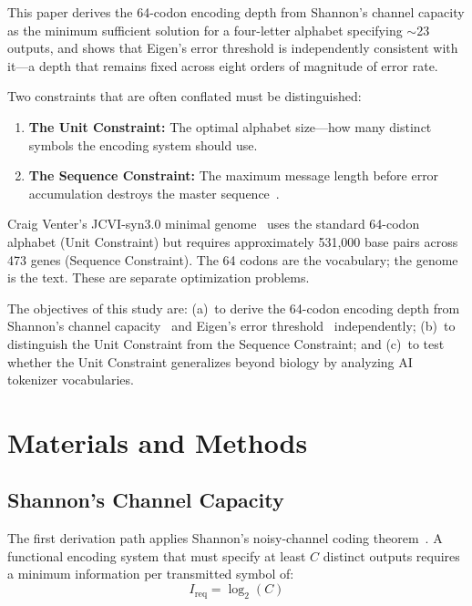 \documentclass[11pt]{article}
\begin{document}
This paper derives the 64-codon encoding depth from Shannon's channel capacity as the minimum sufficient solution for a four-letter alphabet specifying $\sim$23 outputs, and shows that Eigen's error threshold is independently consistent with it---a depth that remains fixed across eight orders of magnitude of error rate.

Two constraints that are often conflated must be distinguished:

\begin{enumerate}
    \item \textbf{The Unit Constraint:} The optimal alphabet size---how many distinct symbols the encoding system should use.
    \item \textbf{The Sequence Constraint:} The maximum message length before error accumulation destroys the master sequence~\cite{eigen1971}.
\end{enumerate}

Craig Venter's JCVI-syn3.0 minimal genome~\cite{hutchison2016} uses the standard 64-codon alphabet (Unit Constraint) but requires approximately 531,000 base pairs across 473 genes (Sequence Constraint). The 64 codons are the vocabulary; the genome is the text. These are separate optimization problems.

The objectives of this study are: (a)~to derive the 64-codon encoding depth from Shannon's channel capacity~\cite{shannon1948} and Eigen's error threshold~\cite{eigen1971} independently; (b)~to distinguish the Unit Constraint from the Sequence Constraint; and (c)~to test whether the Unit Constraint generalizes beyond biology by analyzing AI tokenizer vocabularies.

\section{Materials and Methods}

\subsection{Shannon's Channel Capacity}

The first derivation path applies Shannon's noisy-channel coding theorem~\cite{shannon1948}. A functional encoding system that must specify at least $C$ distinct outputs requires a minimum information per transmitted symbol of:
\begin{equation}
    I_{\mathrm{req}} = \log_2(C)
\end{equation}
\end{document}
